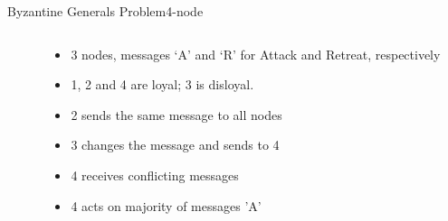 \documentclass[pdf,table]{beamer}
\begin{document}
\begin{frame}{Byzantine Generals Problem}{4-node}
\begin{columns}[T]
\begin{column}{0.48\textwidth}
\begin{tikzpicture}
		\end{tikzpicture}
		\end{column}
		\begin{column}{0.49\textwidth}
			\begin{itemize}
				\item <-2> 3 nodes, messages `A' and `R' for Attack and Retreat, respectively
				\item <2-> 1, 2 and 4 are loyal; 3 is disloyal. 
				\item <2|only@2> 2 sends the same message to all nodes 
				\item <2|only@2> 3 changes the message and sends to 4
				\item <2|only@2> 4 receives conflicting messages
				\item <2|only@2> 4 acts on majority of messages 'A'

			\end{itemize}
		\end{column}
	\end{columns}
\end{frame}
\end{document}
